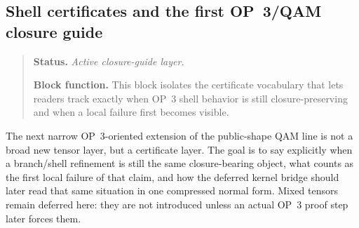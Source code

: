 \subsection*{Shell certificates and the first OP~3/QAM closure guide}
\begin{quote}\small
\noindent\textbf{Status.} \emph{Active closure-guide layer.}\par
\noindent\textbf{Block function.} This block isolates the certificate vocabulary that lets readers track exactly when OP~3 shell behavior is still closure-preserving and when a local failure first becomes visible.
\end{quote}
The next narrow OP~3-oriented extension of the public-shape QAM line is not a broad new tensor layer, but a certificate layer. The goal is to say explicitly when a branch/shell refinement is still the same closure-bearing object, what counts as the first local failure of that claim, and how the deferred kernel bridge should later read that same situation in one compressed normal form. Mixed tensors remain deferred here: they are not introduced unless an actual OP~3 proof step later forces them.

\begin{center}
\end{center}

